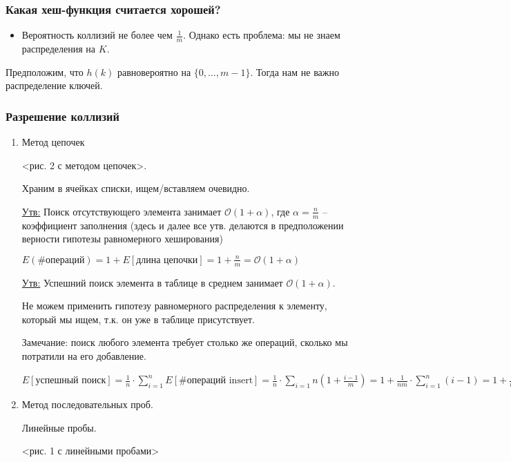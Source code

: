 \documentclass[fleqn, 12pt]{article}
\newcommand{\bigo}{\mathcal{O}}
\begin{document}
\subsubsection{Какая хеш-функция считается хорошей?}

\begin{itemize}
	\item Вероятность коллизий не более чем $ \frac{1}{m} $. Однако есть проблема: мы не знаем распределения на $ K $. 
\end{itemize}

Предположим, что $ h(k) $ равновероятно на $ \{ 0, \ldots, m - 1 \} $. Тогда нам не важно распределение ключей. 


\subsubsection{Разрешение коллизий}

\begin{enumerate}
	\item Метод цепочек
	
	<рис. 2 с методом цепочек>.
	
	Храним в ячейках списки, ищем/вставляем очевидно.
	
	\underline{Утв:} Поиск отсутствующего элемента занимает $ \bigo(1 + \alpha) $, где $ \alpha = \frac{n}{m}  $ -- коэффициент заполнения (здесь и далее все утв. делаются в предположении верности гипотезы равномерного хеширования)
	
	$ E(\#\text{операций}) = 1 + E[\text{длина цепочки}] = 1 + \frac{n}{m} = \bigo(1 + \alpha) $
	
	\underline{Утв:} Успешний поиск элемента в таблице в среднем занимает $ \bigo(1 + \alpha) $. 
	
	Не можем применить гипотезу равномерного распределения к элементу, который мы ищем, т.к. он уже в таблице присутствует. 
	
	Замечание: поиск любого элемента требует столько же операций, сколько мы потратили на его добавление.
	
	$ \displaystyle E[\text{успешный поиск}] = \frac{1}{n} \cdot \sum \limits_{i = 1}^{n} E[\#\text{операций insert}] = \frac {1}{n} \cdot \sum \limits_{i = 1}{n} (1 + \frac{i - 1}{m}) = 1 + \frac{1}{nm} \cdot \sum \limits_{i = 1}^{n}(i - 1) = 1 + \frac{1}{nm} \cdot \frac{(n - 1) \cdot n)}{2} = 1 + \frac{n}{2m} - \frac{1}{2m} = \bigo(1 + \alpha)$
		
	\item Метод последовательных проб.
	
	Линейные пробы. 
	
	<рис. 1 с линейными пробами>
	
\end{enumerate}
\end{document}
